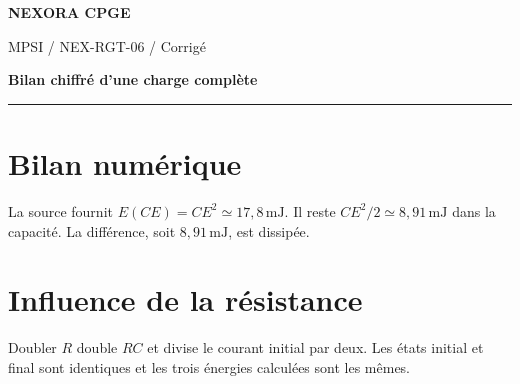 \documentclass[11pt,a4paper]{article}
\begin{document}
{\small\bfseries\color{nexorablue} NEXORA CPGE}\par
{\small MPSI / NEX-RGT-06 / Corrigé}\par
{\LARGE\bfseries Bilan chiffré d’une charge complète}\par
\vspace{0.25em}\hrule\vspace{0.6em}

\section*{Bilan numérique}
La source fournit $E(CE)=CE^2\simeq17{,}8\,\mathrm{mJ}$. Il reste $CE^2/2\simeq8{,}91\,\mathrm{mJ}$ dans la capacité. La différence, soit $8{,}91\,\mathrm{mJ}$, est dissipée.

\section*{Influence de la résistance}
Doubler $R$ double $RC$ et divise le courant initial par deux. Les états initial et final sont identiques et les trois énergies calculées sont les mêmes.
\end{document}
